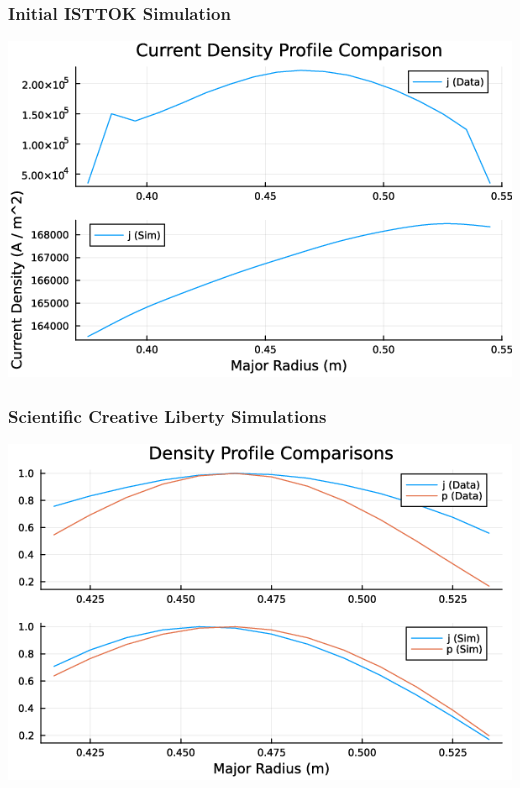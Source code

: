 \documentclass{beamer}
\begin{document}
\begin{frame}
\frametitle{Initial ISTTOK Simulation}

    \includegraphics[scale=0.5]{imgs/comparison-current-0-unfiltered.png}

\end{frame}


\begin{frame}
\frametitle{Scientific Creative Liberty Simulations}

    \includegraphics[scale=0.5]{imgs/comparison-cp-edited-0.png}
\end{frame}
\end{document}
